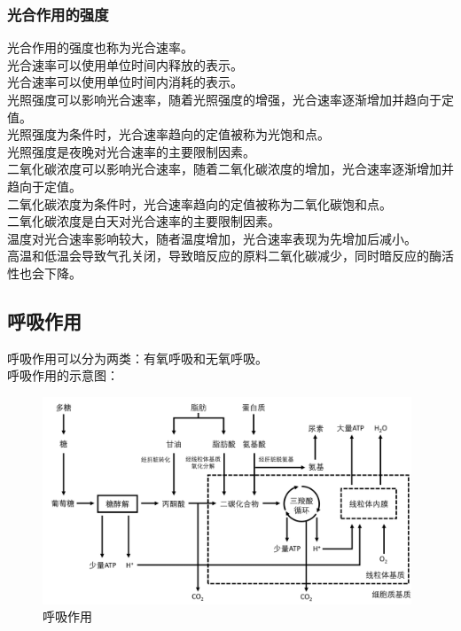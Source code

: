 \documentclass[UTF8]{ctexart}
\begin{document}
\subsubsection{光合作用的强度}
    光合作用的强度也称为光合速率。\\[3mm]
    光合速率可以使用单位时间内释放的表示。\\[3mm]
    光合速率可以使用单位时间内消耗的表示。\\[6mm]
    光照强度可以影响光合速率，随着光照强度的增强，光合速率逐渐增加并趋向于定值。\\[3mm]
    光照强度为条件时，光合速率趋向的定值被称为光饱和点。\\[3mm]
    光照强度是夜晚对光合速率的主要限制因素。\\[6mm]
    二氧化碳浓度可以影响光合速率，随着二氧化碳浓度的增加，光合速率逐渐增加并趋向于定值。\\[3mm]
    二氧化碳浓度为条件时，光合速率趋向的定值被称为二氧化碳饱和点。\\[3mm]
    二氧化碳浓度是白天对光合速率的主要限制因素。\\[6mm]
    温度对光合速率影响较大，随者温度增加，光合速率表现为先增加后减小。\\[3mm]
    高温和低温会导致气孔关闭，导致暗反应的原料二氧化碳减少，同时暗反应的酶活性也会下降。

\newpage
    
\subsection{呼吸作用}
    呼吸作用可以分为两类：有氧呼吸和无氧呼吸。\\[3mm]
    呼吸作用的示意图：
    \begin{figure}[h!]
        \begin{center}
            \includegraphics[width=11cm]{BiologyImage/13.jpg}
            \caption{呼吸作用}
        \end{center}
    \end{figure}\vspace{-30pt}
    
\end{document}
